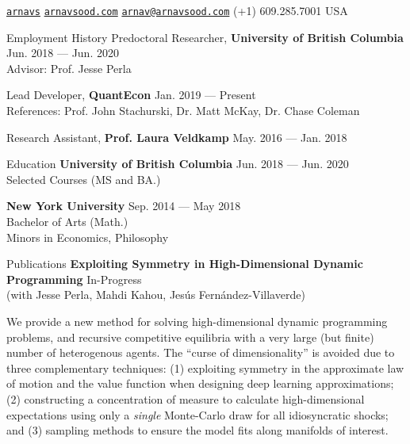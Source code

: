 \documentclass{resume} %
\begin{document}
 \href{https://github.com/arnavs}{\tt arnavs} \vline \hspace{0.5 em} {} \href{https://arnavsood.com}{\tt arnavsood.com} \vline \hspace{0.5 em} {} \href{mailto:arnav@arnavsood.com}{\tt arnav@arnavsood.com} \vline \hspace{0.5 em}  (+1) 609.285.7001 \vline \hspace{0.5 em}  USA 

\begin{rSection}{Employment History}
Predoctoral Researcher, {\bf University of British Columbia} \hfill {Jun. 2018 --- Jun. 2020} 
\\ Advisor: Prof. Jesse Perla \smallskip 

Lead Developer, {\bf QuantEcon} \hfill {Jan. 2019 --- Present}
\\ References: Prof. John Stachurski, Dr. Matt McKay, Dr. Chase Coleman

Research Assistant, {\bf Prof. Laura Veldkamp} \hfill {May. 2016 --- Jan. 2018}

\end{rSection}

\begin{rSection}{Education}
{\bf University of British Columbia} \hfill {Jun. 2018 --- Jun. 2020} 
\\ Selected Courses (MS and BA.)  %

{\bf New York University} \hfill {Sep. 2014 --- May 2018} 
\\ Bachelor of Arts (Math.) %
\\ Minors in Economics, Philosophy 
\end{rSection}

\begin{rSection}{Publications}
    {\bf Exploiting Symmetry in High-Dimensional Dynamic Programming} \hfill {In-Progress} 
    \\ (with Jesse Perla, Mahdi Kahou, Jes\'{u}s Fern\'{a}ndez-Villaverde)    

    We provide a new method for solving high-dimensional dynamic programming problems, and recursive competitive equilibria with a very large (but finite) number of heterogenous agents.  The ``curse of dimensionality'' is avoided due to three complementary techniques: (1) exploiting symmetry in the approximate law of motion and the value function when designing deep learning approximations; (2) constructing a concentration of measure to calculate high-dimensional expectations using only a \textit{single} Monte-Carlo draw for all idiosyncratic shocks; and (3) sampling methods to ensure the model fits along manifolds of interest. 
\end{rSection}
\end{document}
